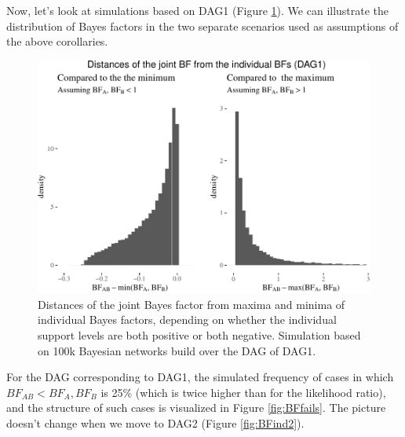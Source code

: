 \documentclass[
  10pt,
  dvipsnames,enabledeprecatedfontcommands]{scrartcl}
\begin{document}
Now, let's look at simulations based on \textsf{DAG1} (Figure
\ref{fig:DAG1BF}). We can illustrate the distribution of Bayes factors
in the two separate scenarios used as assumptions of the above
corollaries.

\vspace{1mm}
\footnotesize

\normalsize

\begin{figure}

\begin{center}\includegraphics[width=1\linewidth]{conjunction-appendix13_files/figure-latex/BFind-1} \end{center}
\caption{Distances of the joint Bayes factor from maxima and minima of individual Bayes factors, depending on whether the individual support levels are both positive or both negative. Simulation based on 100k Bayesian networks build over the DAG of \textsf{DAG1}.}
\label{fig:DAG1BF}
\end{figure}

For the DAG corresponding to \textsf{DAG1}, the simulated frequency of
cases in which \(BF_{AB} < BF_{A}, BF_{B}\) is 25\% (which is twice
higher than for the likelihood ratio), and the structure of such cases
is visualized in Figure \ref{fig:BFfails}. The picture doesn't change
when we move to \textsf{DAG2} (Figure \ref{fig:BFind2}).
\end{document}
